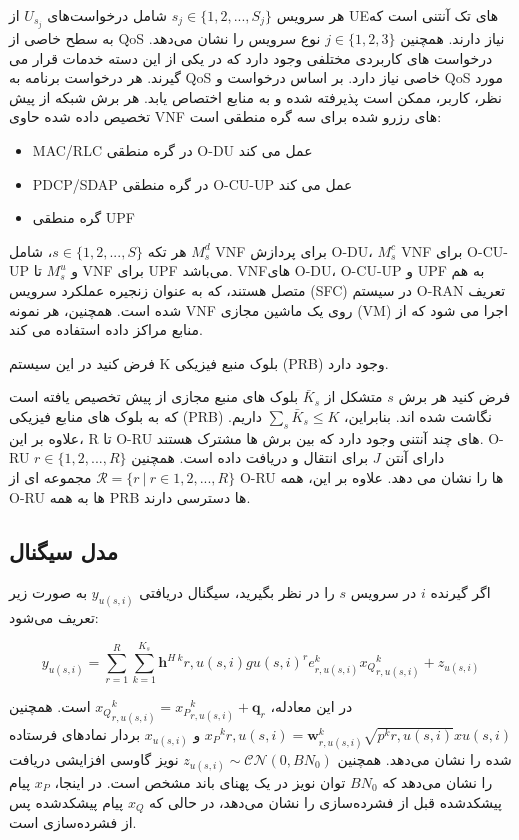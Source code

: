    هر سرویس $s_j\in \{1,2,...,S_j\} $ شامل درخواست‌های $U_{s_j}$ از UE‌های تک آنتنی است که به سطح خاصی از QoS نیاز دارند.
   همچنین $j \in \{1,2,3\}$ نوع سرویس را نشان می‌دهد.
   درخواست های کاربردی مختلفی وجود دارد که در یکی از این دسته خدمات قرار می گیرند. هر درخواست برنامه به QoS خاصی نیاز دارد. بر اساس درخواست و QoS
   مورد نظر، 
    کاربر،
     ممکن است پذیرفته شده و به منابع اختصاص یابد.
   هر برش شبکه از پیش تخصیص داده شده حاوی VNF های رزرو شده برای سه گره منطقی است:
   
   
   \begin{itemize}
   	\item MAC/RLC در گره منطقی O-DU عمل می کند
   	\item PDCP/SDAP در گره منطقی O-CU-UP عمل می کند
   	\item گره منطقی UPF
   \end{itemize}
   
   هر تکه $s \in \{1,2,...,S \}$، شامل $M_s^{d}$ VNF برای پردازش O-DU،   
   $M_s^c$
   VNF 
   برای O-CU-UP و 
   $M_s^u$
   تا VNF 
   برای UPF می‌باشد.
   VNFهای O-DU، O-CU-UP و UPF به هم متصل هستند، که به عنوان زنجیره عملکرد سرویس (SFC) در سیستم O-RAN تعریف شده است. همچنین، هر نمونه VNF روی یک ماشین مجازی (VM) اجرا می شود که از منابع مراکز داده استفاده می کند.
   
   فرض کنید در این سیستم K بلوک‌ منبع فیزیکی (PRB)
     وجود دارد.
   
   فرض کنید هر برش $s$ متشکل از $\bar{K}_s$ بلوک های منبع مجازی از پیش تخصیص یافته است که به بلوک های منابع فیزیکی (PRB) نگاشت شده اند. بنابراین، $\sum_s \bar{K}_s \leq K$ داریم.
   علاوه بر این، R تا
    O-RU های چند آنتنی وجود دارد که بین برش ها مشترک هستند.
   O-RU $r \in \{1,2,...,R \}$ دارای آنتن $J$ برای انتقال و دریافت داده است. همچنین $\mathcal{R} = \{ r \ | \ r\in 1,2,...,R \}$ مجموعه ای از O-RU ها را نشان می دهد. علاوه بر این، همه O-RU ها به همه PRB ها دسترسی دارند.
 \subsection{مدل سیگنال}
   اگر گیرنده $i$ در سرویس $s$ را در نظر بگیرید، سیگنال دریافتی $y_{u(s,i)}$ به صورت زیر تعریف می‌شود:
   
   \begin{equation}\label{eq2}
   	y_{u(s,i)} = \sum_{r=1}^{R} \sum_{k=1}^{K_s} \boldsymbol{h}^{H \: k}{r,u(s,i)} g{u(s,i)}^r e^k_{r,u(s,i)}{x_Q}^k_{r,u(s,i)} + z_{u(s,i)}
   \end{equation}
   
   در این معادله، ${x_Q}^k_{r,u(s,i)} = {x_P}^k_{r,u(s,i)} + \boldsymbol{q}_{r}$ است. همچنین ${x_P}^k{r,u(s,i)} = \boldsymbol{w}^k_{r,u(s,i)}\sqrt{p^{k}{r,u(s,i)}} x{u(s,i)}$ و $x_{u(s,i)}$ بردار نمادهای فرستاده شده را نشان می‌دهد. همچنین $z_{u(s,i)} \sim \mathcal{CN}(0,BN_0)$ نویز گاوسی افزایشی دریافت را نشان می‌دهد که $BN_0$ توان نویز در یک پهنای باند مشخص است. در اینجا، ${x_P}$ پیام پیشکدشده قبل از فشرده‌سازی را نشان می‌دهد، در حالی که ${x_Q}$ پیام پیشکدشده پس از فشرده‌سازی است. 
   
